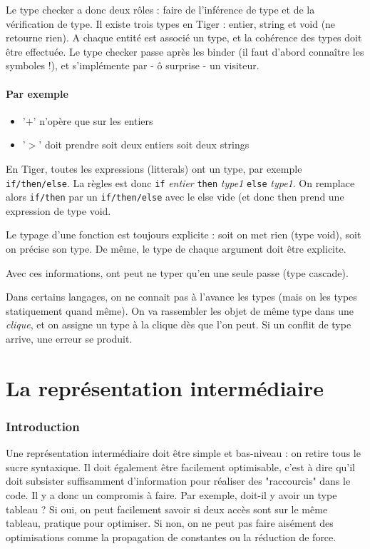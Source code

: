 \documentclass{article}
\begin{document}
Le type checker a donc deux rôles : faire de l'inférence de type et de la vérification de type. Il existe trois types en Tiger : entier, string et void (ne retourne rien). A chaque entité est associé un type, et la cohérence des types doit être effectuée. Le type checker passe après les binder (il faut d'abord connaître les symboles !), et s'implémente par - ô surprise - un visiteur.

\paragraph{Par exemple} 
\begin{itemize}
\item '$+$' n'opère que sur les entiers
\item '$>$' doit prendre soit deux entiers soit deux strings
\end{itemize}
\bigskip

En Tiger, toutes les expressions (litterals) ont un type, par exemple \texttt{if/then/else}. La règles est donc \texttt{if} \emph{entier} \texttt{then} \emph{type1} \texttt{else} \emph{type1}. On remplace alors \texttt{if/then} par un \texttt{if/then/else} avec le else vide (et donc then prend une expression de type void.

Le typage d'une fonction est toujours explicite : soit on met rien (type void), soit on précise son type. De même, le type de chaque argument doit être explicite.

Avec ces informations, ont peut ne typer qu'en une seule passe (type cascade).

Dans certains langages, on ne connait pas à l'avance les types (mais on les types statiquement quand même). On va rassembler les objet de même type dans une \emph{clique}, et on assigne un type à la clique dès que l'on peut. Si un conflit de type arrive, une erreur se produit.


\section{La représentation intermédiaire}
\subsubsection{Introduction}
Une représentation intermédiaire doit être simple et bas-niveau : on retire tous le sucre syntaxique. Il doit également être facilement optimisable, c'est à dire qu'il doit subsister suffisamment d'information pour réaliser des "raccourcis" dans le code. Il y a donc un compromis à faire. Par exemple, doit-il y avoir un type tableau ? Si oui, on peut facilement savoir si deux accès sont sur le même tableau, pratique pour optimiser. Si non, on ne peut pas faire aisément des optimisations comme la propagation de constantes ou la réduction de force.
\end{document}
